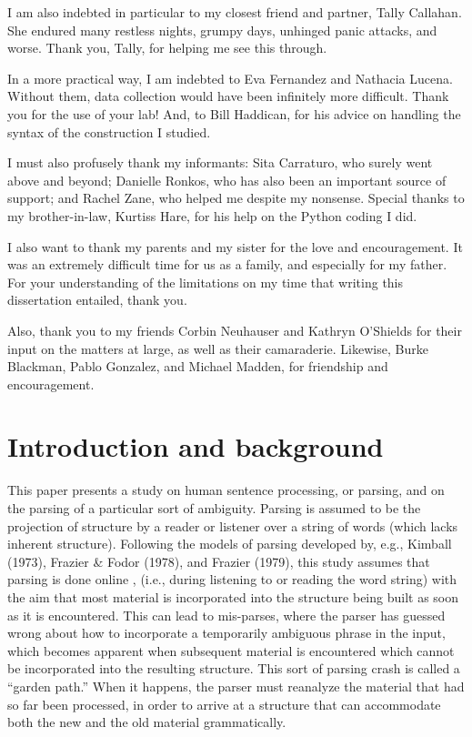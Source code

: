 \documentclass[11pt,oneside]{book}
\begin{document}
I am also indebted in particular to my closest friend and partner, Tally Callahan. She endured many restless nights, grumpy days, unhinged panic attacks, and worse. Thank you, Tally, for helping me see this through.

In a more practical way, I am indebted to Eva Fernandez and Nathacia Lucena. Without them, data collection would have been infinitely more difficult. Thank you for the use of your lab! And, to Bill Haddican, for his advice on handling the syntax of the construction I studied. 

I must also profusely thank my informants: Sita Carraturo, who surely went above and beyond; Danielle Ronkos, who has also been an important source of support; and Rachel Zane, who helped me despite my nonsense. Special thanks to my brother-in-law, Kurtiss Hare, for his help on the Python coding I did. 

I also want to thank my parents and my sister for the love and encouragement. It was an extremely difficult time for us as a family, and especially for my father. For your understanding of the limitations on my time that writing this dissertation entailed, thank you. 

Also, thank you to my friends Corbin Neuhauser and Kathryn O’Shields for their input on the matters at large, as well as their camaraderie. Likewise, Burke Blackman, Pablo Gonzalez, and Michael Madden, for friendship and encouragement.

\pagebreak

{
\setcounter{tocdepth}{1}
\tableofcontents
}
\listoftables
\listoffigures
\pagebreak


\hypertarget{introduction-and-background}{%
\chapter{Introduction and background}\label{introduction-and-background}}

This paper presents a study on human sentence processing, or parsing, and on the parsing of a particular sort of ambiguity. Parsing is assumed to be the projection of structure by a reader or listener over a string of words (which lacks inherent structure). Following the models of parsing developed by, e.g., Kimball (1973), Frazier \& Fodor (1978), and Frazier (1979), this study assumes that parsing is done online , (i.e., during listening to or reading the word string) with the aim that most material is incorporated into the structure being built as soon as it is encountered. This can lead to mis-parses, where the parser has guessed wrong about how to incorporate a temporarily ambiguous phrase in the input, which becomes apparent when subsequent material is encountered which cannot be incorporated into the resulting structure. This sort of parsing crash is called a ``garden path.'' When it happens, the parser must reanalyze the material that had so far been processed, in order to arrive at a structure that can accommodate both the new and the old material grammatically.
\end{document}
